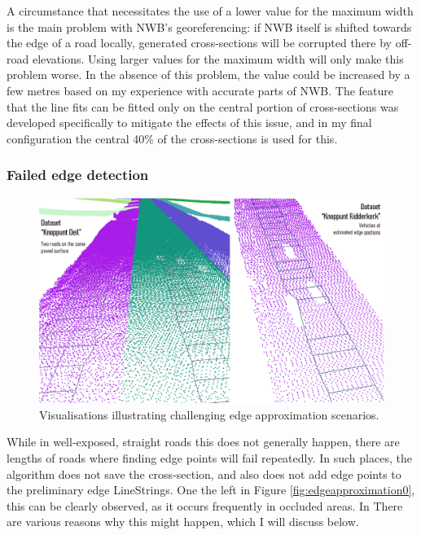 A circumstance that necessitates the use of a lower value for the maximum width is the main problem with NWB's georeferencing: if NWB itself is shifted towards the edge of a road locally, generated cross-sections will be corrupted there by off-road elevations. Using larger values for the maximum width will only make this problem worse. In the absence of this problem, the value could be increased by a few metres based on my experience with accurate parts of NWB. The feature that the line fits can be fitted only on the central portion of cross-sections was developed specifically to mitigate the effects of this issue, and in my final configuration the central 40\% of the cross-sections is used for this.

\subsubsection{Failed edge detection}

\begin{figure}
    \centering
    \includegraphics[width=0.9\linewidth]{final_report/figs/edgeapproximation1.png}
    \caption{Visualisations illustrating challenging edge approximation scenarios.}
    \label{fig:edgeapproximation1}
\end{figure}

While in well-exposed, straight roads this does not generally happen, there are lengths of roads where finding edge points will fail repeatedly. In such places, the algorithm does not save the cross-section, and also does not add edge points to the preliminary edge LineStrings. One the left in Figure \ref{fig:edgeapproximation0}, this can be clearly observed, as it occurs frequently in occluded areas. In There are various reasons why this might happen, which I will discuss below.

